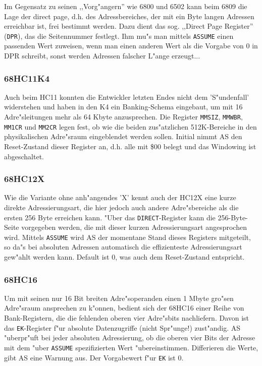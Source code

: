 \documentclass[12pt,a4paper,twoside]{report}
\newcommand{\tty}[1]{{\tt #1}}
\begin{document}
Im Gegensatz zu seinen ,,Vorg"angern'' wie 6800 und 6502 kann beim
6809 die Lage der direct page, d.h. des Adressbereiches, der mit ein
Byte langen Adressen erreichbar ist, frei bestimmt werden.  Dazu dient
das sog. ,,Direct Page Register'' (\tty{DPR}), das die Seitennummer
festlegt.  Ihm mu"s man mittels \tty{ASSUME} einen passenden Wert
zuweisen, wenn man einen anderen Wert als die Vorgabe von 0 in DPR
schreibt, sonst werden Adressen falscher L"ange erzeugt...



\subsubsection{68HC11K4}

Auch beim HC11 konnten die Entwickler letzten Endes nicht dem
'S"undenfall' widerstehen und haben in den K4 ein Banking-Schema
eingebaut, um mit 16 Adre"sleitungen mehr als 64 Kbyte anzusprechen.  Die
Register {\tt MMSIZ}, {\tt MMWBR}, {\tt MM1CR} und {\tt MM2CR} legen fest,
ob wie die beiden zus"atzlichen 512K-Bereiche in den physikalischen
Adre"sraum eingeblendet werden sollen.  Initial nimmt AS den Reset-Zustand
dieser Register an, d.h. alle mit \$00 belegt und das Windowing ist
abgeschaltet.


\subsubsection{68HC12X}

Wie die Variante ohne anh"angendes 'X' kennt auch der HC12X eine kurze
direkte Adressierungsart, die hier jedoch auch andere Adre"sbereiche als
die ersten 256 Byte erreichen kann.  "Uber das {\tt DIRECT}-Register kann
die 256-Byte-Seite vorgegeben werden, die mit dieser kurzen
Adressierungsart angesprochen wird.  Mittels {\tt ASSUME} wird AS der
momentane Stand dieses Registers mitgeteilt, so da"s bei absoluten
Adressen automatisch die effizienteste Adressierungsart gew"ahlt werden
kann.  Default ist 0, was auch dem Reset-Zustand entspricht.

\subsubsection{68HC16}

Um mit seinen nur 16 Bit breiten Adre"soperanden einen 1 Mbyte gro"sen
Adre"sraum ansprechen zu k"onnen, bedient sich der 68HC16 einer Reihe
von Bank-Registern, die die fehlenden oberen vier Adre"sbits nachliefern.
Davon ist das \tty{EK}-Register f"ur absolute Datenzugriffe (nicht
Spr"unge!) zust"andig.  AS "uberpr"uft bei jeder absoluten Adressierung,
ob die oberen vier Bits der Adresse mit dem "uber \tty{ASSUME}
spezifizierten Wert "ubereinstimmen.  Differieren die Werte, gibt AS eine
Warnung aus.  Der Vorgabewert f"ur \tty{EK} ist 0.
\end{document}
